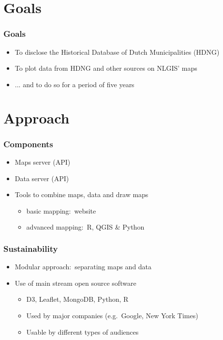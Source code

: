 \documentclass{beamer}
\begin{document}

\section{Goals}
\begin{frame}
	\frametitle{Goals}
	\begin{itemize}
		\item To disclose the Historical Database of Dutch Municipalities (HDNG)
		\item To plot data from HDNG and other sources on NLGIS' maps 
		\item ... and to do so for a period of five years
	\end{itemize}	
\end{frame}

\section{Approach}
\begin{frame}
	\frametitle{Components}
	\begin{itemize}
		\item Maps server (API)
		\item Data server (API) 
		\item Tools to combine maps, data and draw maps
			\begin{itemize}
				\item basic mapping:~website
				\item advanced mapping:~R,  QGIS \& Python
			\end{itemize}
	\end{itemize}
\end{frame}


\begin{frame}
	\frametitle{Sustainability}
	\begin{itemize}
		\item Modular approach:~separating maps and data
		\item Use of main stream open source software
			\begin{itemize}
				\item D3, Leaflet, MongoDB, Python, R
				\item Used by major companies (e.g.~Google, New York Times)
				\item Usable by different types of audiences
			\end{itemize}
	\end{itemize}
\end{frame}
\end{document}

